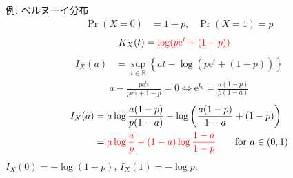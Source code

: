 \documentclass[lualatex,handout]{beamer}
\newcommand{\mycolor}[2]{%
  \begingroup
  \colorlet{currentcolor}{.}%
  \color{#1}#2%
  \color{currentcolor}%
  \endgroup
}
\newcommand{\emm}[1]{\mycolor{red}{#1}}
\theoremstyle{definition}
\begin{document}
\begin{frame}{例: ベルヌーイ分布}
\begin{align*}
\Pr(X=0) &= 1-p,&\Pr(X=1)=p
\end{align*}
\begin{align*}
K_X(t) &= \emm{\log(p\mathrm{e}^t + (1-p))}
\end{align*}
\begin{align*}
I_X(a) &= \sup_{t\in\mathbb{R}} \left\{ at - \log(p\mathrm{e}^t+(1-p))\right\}
\end{align*}
\begin{align*}
a - \frac{p\mathrm{e}^{t_a}}{p\mathrm{e}^{t_a}+1-p} = 0
\iff \mathrm{e}^{t_a} = \frac{a(1-p)}{p(1-a)}
\end{align*}
\begin{align*}
I_X(a) &= a\log\frac{a(1-p)}{p(1-a)} - \log\left(\frac{a(1-p)}{1-a} + (1-p)\right)\\
 &= \emm{a\log\frac{a}{p} + (1-a)\log\frac{1-a}{1-p}} \qquad\text{for } a\in(0,1)
\end{align*}
$I_X(0) = -\log(1-p)$, $I_X(1) = -\log p$.
\end{frame}
\end{document}
